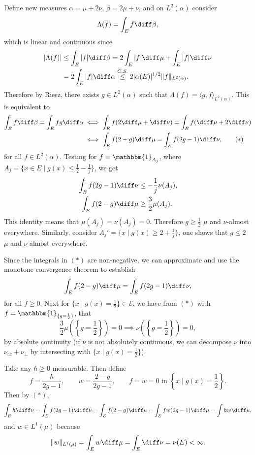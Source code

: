 \documentclass[12pt]{article}
\begin{document}
\begin{proofbox}
	Define new measures $\alpha = \mu + 2 \nu$, $\beta = 2 \mu + \nu$, and on $L^2(\alpha)$ consider
	\[
	\Lambda(f) = \int_E f \diff \beta,
	\]
	which is linear and continuous since
	\begin{align*}
		|\Lambda(f)| &\leq \int_E |f| \diff \beta = 2 \int_E |f| \diff \mu + \int_E |f| \diff \nu \\
			     &= 2 \int_E |f| \diff \alpha \overset{C.S.}{\leq} 2|\alpha(E)|^{1/2} \|f\|_{L^2(\alpha)}.
	\end{align*}
	Therefore by Riesz, there exists $g \in L^2(\alpha)$ such that $\Lambda(f) = \langle g, f\rangle_{L^2(\alpha)}$. This is equivalent to
	\begin{align*}
		\int_E f \diff \beta = \int_E f g \diff \alpha &\iff \int_E f (2 \diff \mu + \diff \nu) = \int_E f (\diff \mu + 2 \diff \nu) \\
							       &\iff \int_E f(2 - g) \diff \mu = \int_E f(2 g - 1) \diff \nu, \tag{$*$}
	\end{align*}
	for all $f \in L^2(\alpha)$. Testing for $f = \mathbbm{1}_{A_j}$, where $A_j = \{x \in E \mid g(x) \leq \frac{1}{2} - \frac{1}{j}\}$, we get
	\begin{align*}
		\int_E f(2g - 1) \diff \nu &\leq - \frac{1}{j} \nu(A_j), \\
		\int_E f(2 - g) \diff \mu &\geq \frac{3}{2} \mu(A_j).
	\end{align*}
	This identity means that $\mu(A_j) = \nu(A_j) = 0$. Therefore $g \geq \frac{1}{2}$ $\mu$ and $\nu$-almost everywhere. Similarly, consider $A_j' = \{x \mid g(x) \geq 2 + \frac{1}{j}\}$, one shows that $g \leq 2$ $\mu$ and $\nu$-almost everywhere.

	Since the integrals in $(\ast)$ are non-negative, we can approximate and use the monotone convergence theorem to establish
	\[
	\int_E f(2 - g)\diff \mu = \int_E f (2g - 1) \diff \nu,
	\]
	for all $f \geq 0$. Next for $\{x \mid g(x) = \frac{1}{2}\} \in \mathcal{E}$, we have from $(\ast)$ with $f = \mathbbm{1}_{\{g = \frac{1}{2}\}}$, that
	\[
		\frac{3}{2} \mu\left( \left\{ g = \frac{1}{2} \right\}\right) = 0 \implies \nu\left( \left\{ g = \frac{1}{2} \right\}\right) = 0,
	\]
	by absolute continuity (if $\nu$ is not absolutely continuous, we can decompose $\nu$ into $\nu_{\mathrm{ac}} + \nu_{\perp}$ by intersecting with $\{x \mid g(x) = \frac{1}{2}\}$).

	Take any $h \geq 0$ measurable. Then define
	\[
		f = \frac{h}{2g - 1}, \qquad w = \frac{2 - g}{2g - 1}, \qquad f = w = 0 \text{ in } \left\{x \mid g(x) = \frac{1}{2} \right\}.
	\]
	Then by $(\ast)$,
	\[
	\int_E h \diff \nu = \int_E f(2g - 1) \diff \nu = \int_E f(2 - g) \diff \mu = \int_E f w (2g - 1) \diff \mu = \int h w \diff \mu,
	\]
	and $w \in L^1(\mu)$ because
	\[
	\|w\|_{L^1(\mu)} = \int_E w \diff \mu = \int_E \diff \nu = \nu(E) < \infty.
	\]
\end{proofbox}
\end{document}
